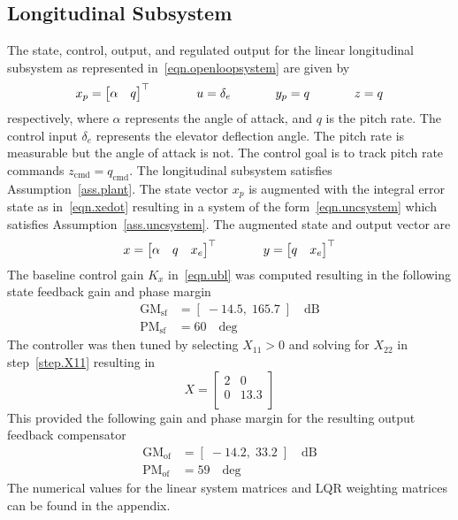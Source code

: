 \documentclass[]{../sty/aiaa-tc}
\begin{document}
  \subsection{Longitudinal Subsystem}

  The state, control, output, and regulated output for the linear longitudinal subsystem as represented in\ \eqref{eqn.openloopsystem} are given by
  \begin{equation*}
    x_{p}=
    \begin{bmatrix}
      \alpha & q
    \end{bmatrix}^{\top}
    \hspace{0.5in}
    u=\delta_{e}
    \hspace{0.5in}
    y_{p}=q
    \hspace{0.5in}
    z=q
  \end{equation*}
  respectively, where $\alpha$ represents the angle of attack, and $q$ is the pitch rate.
  The control input $\delta_{e}$ represents the elevator deflection angle.
  The pitch rate is measurable but the angle of attack is not.
  The control goal is to track pitch rate commands $z_{\text{cmd}}=q_{\text{cmd}}$.
  The longitudinal subsystem satisfies Assumption~\ref{ass.plant}.
  The state vector $x_{p}$ is augmented with the integral error state as in\ \eqref{eqn.xedot} resulting in a system of the form\ \eqref{eqn.uncsystem} which satisfies Assumption~\ref{ass.uncsystem}.
  The augmented state and output vector are
  \begin{equation*}
    x=
    \begin{bmatrix}
      \alpha & q & x_{e}
    \end{bmatrix}^{\top}
    \hspace{0.5in}
    y=
    \begin{bmatrix}
      q & x_{e}
    \end{bmatrix}^{\top}
  \end{equation*}
  The baseline control gain $K_{x}$ in\ \eqref{eqn.ubl} was computed resulting in the following state feedback gain and phase margin
  \begin{align*}
    \text{GM}_{\text{sf}}&=[\;-14.5,\; 165.7\;] \quad \text{dB}\\
    \text{PM}_{\text{sf}}&=60 \quad \text{deg}
  \end{align*}
  The controller was then tuned by selecting $X_{11}>0$ and solving for $X_{22}$ in step~\ref{step.X11} resulting in
  \begin{equation*}
    X=
    \left[
    \begin{array}{cc}
      2 & 0 \\
      0 & 13.3 \\
    \end{array}\right]
  \end{equation*}
  This provided the following gain and phase margin for the resulting output feedback compensator
  \begin{align*}
    \text{GM}_{\text{of}}&=[\; -14.2 ,\; 33.2 \;] \quad \text{dB}\\
    \text{PM}_{\text{of}}&=59 \quad \text{deg}
  \end{align*}
  The numerical values for the linear system matrices and LQR weighting matrices can be found in the appendix.
\end{document}
